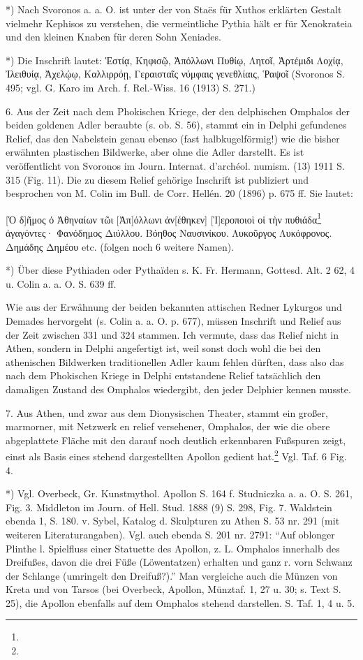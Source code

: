 \documentclass[a4paper, 11pt, oneside]{article}
\begin{document}
*) Nach Svoronos a. a. O. ist unter der von Staës für Xuthos erklärten Gestalt vielmehr Kephisos zu verstehen, die vermeintliche Pythia hält er für Xenokrateia und den kleinen Knaben für deren Sohn Xeniades.

*) Die Inschrift lautet: Ἑστίᾳ, Κηφισῷ, Ἀπόλλωνι Πυθίῳ, Λητοῖ, Ἀρτέμιδι Λοχίᾳ, Ἰλειθυίᾳ, Ἀχελῴῳ, Καλλιρρόῃ, Γεραισταῖς νύμφαις γενεθλίαις, Ῥαψοῖ (Svoronos S. 495; vgl. G. Karo im Arch. f. Rel.-Wiss. 16 (1913) S. 271.)

6. Aus der Zeit nach dem Phokischen Kriege, der den delphischen Omphalos der beiden goldenen Adler beraubte (s. ob. S. 56), stammt ein in Delphi gefundenes Relief, das den Nabelstein genau ebenso (fast halbkugelförmig!) wie die bisher erwähnten plastischen Bildwerke, aber ohne die Adler darstellt. Es ist veröffentlicht von Svoronos im Journ. Internat. d'archéol. numism. (13) 1911 S. 315 (Fig. 11). Die zu diesem Relief gehörige Inschrift ist publiziert und besprochen von M. Colin im Bull. de Corr. Hellén. 20 (1896) p. 675 ff. Sie lautet:

[Ὁ δ]ῆμος ὁ Ἀθηναίων τῶι [Ἀπ]όλλωνι ἀν[έθηκεν]  
[Ἱ]εροποιοὶ οἱ τὴν πυθιάδα\footnote{} ἀγαγόντες·  
Φανόδημος Διύλλου.  
Βόηθος Ναυσινίκου.  
Λυκοῦργος Λυκόφρονος.  
Δημάδης Δημέου etc. (folgen noch 6 weitere Namen).

*) Über diese Pythiaden oder Pythaïden s. K. Fr. Hermann, Gottesd. Alt. 2 62, 4 u. Colin a. a. O. S. 639 ff.

Wie aus der Erwähnung der beiden bekannten attischen Redner Lykurgos und Demades hervorgeht (s. Colin a. a. O. p. 677), müssen Inschrift und Relief aus der Zeit zwischen 331 und 324 stammen. Ich vermute, dass das Relief nicht in Athen, sondern in Delphi angefertigt ist, weil sonst doch wohl die bei den athenischen Bildwerken traditionellen Adler kaum fehlen dürften, dass also das nach dem Phokischen Kriege in Delphi entstandene Relief tatsächlich den damaligen Zustand des Omphalos wiedergibt, den jeder Delphier kennen musste.

7. Aus Athen, und zwar aus dem Dionysischen Theater, stammt ein großer, marmorner, mit Netzwerk en relief versehener, Omphalos, der wie die obere abgeplattete Fläche mit den darauf noch deutlich erkennbaren Fußspuren zeigt, einst als Basis eines stehend dargestellten Apollon gedient hat.\footnote{} Vgl. Taf. 6 Fig. 4.

*) Vgl. Overbeck, Gr. Kunstmythol. Apollon S. 164 f. Studniczka a. a. O. S. 261, Fig. 3. Middleton im Journ. of Hell. Stud. 1888 (9) S. 298, Fig. 7. Waldstein ebenda 1, S. 180. v. Sybel, Katalog d. Skulpturen zu Athen S. 53 nr. 291 (mit weiteren Literaturangaben). Vgl. auch ebenda S. 201 nr. 2791: "`Auf oblonger Plinthe l. Spielfluss einer Statuette des Apollon, z. L. Omphalos innerhalb des Dreifußes, davon die drei Füße (Löwentatzen) erhalten und ganz r. vorn Schwanz der Schlange (umringelt den Dreifuß?)."' Man vergleiche auch die Münzen von Kreta und von Tarsos (bei Overbeck, Apollon, Münztaf. 1, 27 u. 30; s. Text S. 25), die Apollon ebenfalls auf dem Omphalos stehend darstellen. S. Taf. 1, 4 u. 5.
\end{document}
